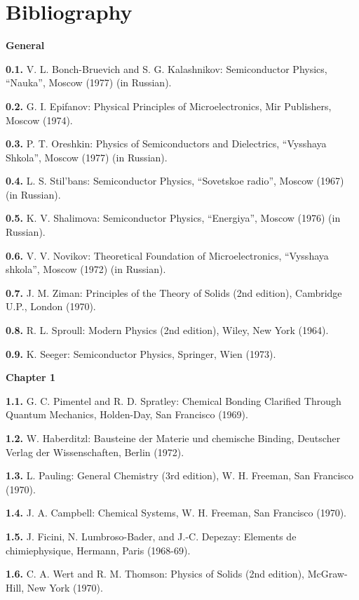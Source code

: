 

\chapter*{Bibliography}

\parindent=0mm

\vspace*{-12pt}

{\large{\sffamily\bfseries General}}

{\small

\textbf{0.1.} V. L. Bonch-Bruevich and S. G. Kalashnikov: Semiconductor Physics, ``Nauka'', Moscow (1977) (in Russian).

\textbf{0.2.} G. I. Epifanov: Physical Principles of Microelectronics, Mir Publishers, Moscow (1974).

\textbf{0.3.} P. T. Oreshkin: Physics of Semiconductors and Dielectrics, ``Vysshaya Shkola'', Moscow (1977) (in Russian).

\textbf{0.4.} L. S. Stil'bans: Semiconductor Physics, ``Sovetskoe radio'', Moscow (1967) (in Russian).

\textbf{0.5.} K. V. Shalimova: Semiconductor Physics, ``Energiya'', Moscow (1976)
(in Russian).

\textbf{0.6.} V. V. Novikov: Theoretical Foundation of Microelectronics, ``Vysshaya shkola'', Moscow (1972) (in Russian).

\textbf{0.7.} J. M. Ziman: Principles of the Theory of Solids (2nd edition), Cambridge U.P., London (1970).

\textbf{0.8.} R. L. Sproull: Modern Physics (2nd edition), Wiley, New York (1964).

\textbf{0.9.} K. Seeger: Semiconductor Physics, Springer, Wien (1973).

}

\bigskip

{\large{\sffamily\bfseries Chapter 1}}

\small{

\textbf{1.1.} G. C. Pimentel and R. D. Spratley: Chemical Bonding Clarified Through Quantum Mechanics, Holden-Day, San Francisco (1969).

\textbf{1.2.} W. Haberditzl: Bausteine der Materie und chemische Binding, Deutscher Verlag der Wissenschaften, Berlin (1972).

\textbf{1.3.} L. Pauling: General Chemistry (3rd edition), W. H. Freeman, San Francisco (1970).

\textbf{1.4.} J. A. Campbell: Chemical Systems, W. H. Freeman, San Francisco (1970).

\textbf{1.5.} J. Ficini, N. Lumbroso-Bader, and J.-C. Depezay: Elements de chimiephysique, Hermann, Paris (1968-69).

\textbf{1.6.} C. A. Wert and R. M. Thomson: Physics of Solids (2nd edition), McGraw-Hill, New York (1970).

}

